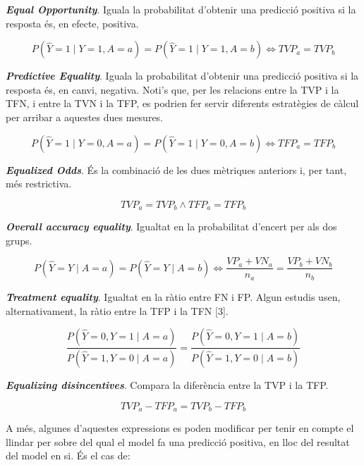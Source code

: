\documentclass[CAT]{TFUOC}%
\begin{document}
\textbf{\emph{Equal Opportunity}}. Iguala la probabilitat d'obtenir una predicció positiva si la resposta és, en efecte, positiva.

\begin{equation}
P(\hat Y = 1 \mid Y = 1, A = a) = P(\hat Y = 1 \mid Y = 1, A = b) \Leftrightarrow TVP_a = TVP_b
\end{equation}

\textbf{\emph{Predictive Equality}}. Iguala la probabilitat d'obtenir una predicció positiva si la resposta és, en canvi, negativa. Noti's que, per les relacions entre la TVP i la TFN, i entre la TVN i la TFP, es podrien fer servir diferents estratègies de càlcul per arribar a aquestes dues mesures.

\begin{equation}
P(\hat Y = 1 \mid Y = 0, A = a) = P(\hat Y = 1 \mid Y = 0, A = b) \Leftrightarrow TFP_a = TFP_b
\end{equation}

\textbf{\emph{Equalized Odds}}. És la combinació de les dues mètriques anteriors i, per tant, més restrictiva.

\begin{equation}
TVP_a = TVP_b \wedge TFP_a = TFP_b
\end{equation}

\textbf{\emph{Overall accuracy equality}}. Igualtat en la probabilitat d'encert per als dos grups.

\begin{equation}
P(\hat Y = Y \mid A = a) = P(\hat Y = Y \mid A = b) \Leftrightarrow \frac{VP_a + VN_a}{n_a} = \frac{VP_b + VN_b}{n_b}
\end{equation}

\textbf{\emph{Treatment equality}}. Igualtat en la ràtio entre FN i FP. Algun estudis usen, alternativament, la ràtio entre la TFP i la TFN {[}3{]}.

\begin{equation}
\frac{P(\hat Y = 0, Y = 1 \mid A = a)}{P(\hat Y = 1, Y = 0 \mid A = a)} = \frac{P(\hat Y = 0, Y = 1 \mid A = b)}{P(\hat Y = 1, Y = 0 \mid A = b)}
\end{equation}

\textbf{\emph{Equalizing disincentives}}. Compara la diferència entre la TVP i la TFP.

\begin{equation}
TVP_a - TFP_a = TVP_b - TFP_b
\end{equation}

A més, algunes d'aquestes expressions es poden modificar per tenir en compte el llindar per sobre del qual el model fa una predicció positiva, en lloc del resultat del model en si. És el cas de:
\end{document}
